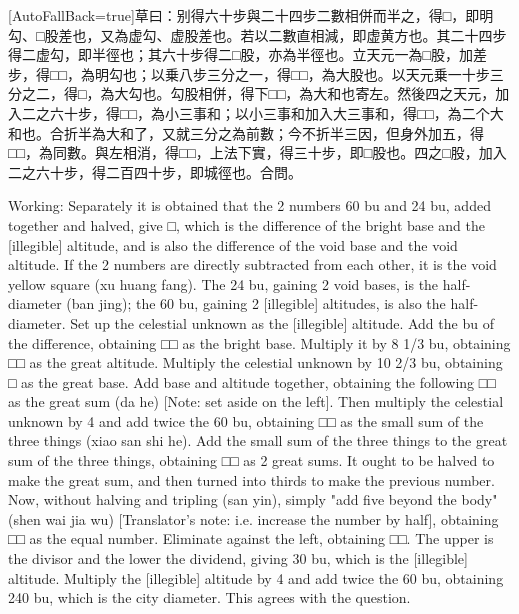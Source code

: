 \documentclass[11pt]{article}
\newcommand{\zhsmall}{\footnotesize\color{black!70}}
\newcommand{\unitlabel}[1]{\marginpar{\raggedleft\tiny\color{gray}#1}}
\newenvironment{unitzh}{\par\CJKfontspec{Noto Serif CJK SC}[AutoFallBack=true]\large\linespread{1.25}\selectfont}{\par}
\newenvironment{uniten}{\par\small\color{black!85}}{\par\medskip}
\begin{document}
\begin{unitzh}\unitlabel{ceyuan-033.18}草曰：别得六十步與二十四步二數相併而半之，得□，即明勾、□股差也，又為虚勾、虚股差也。若以二數直相減，即虚黄方也。其二十四步得二虚勾，即半徑也；其六十步得二□股，亦為半徑也。立天元一為□股，加差步，得□□，為明勾也；以乗八步三分之一，得□□，為大股也。以天元乗一十步三分之二，得□，為大勾也。勾股相併，得下□□，為大和也{\zhsmall 寄左}。然後四之天元，加入二之六十步，得□□，為小三事和；以小三事和加入大三事和，得□□，為二个大和也。合折半為大和了，又就三分之為前數；今不折半三因，但身外加五，得□□，為同數。與左相消，得□□，上法下實，得三十步，即□股也。四之□股，加入二之六十步，得二百四十步，即城徑也。合問。\end{unitzh}
\begin{uniten}Working: Separately it is obtained that the 2 numbers 60 bu and 24 bu, added together and halved, give □, which is the difference of the bright base and the [illegible] altitude, and is also the difference of the void base and the void altitude. If the 2 numbers are directly subtracted from each other, it is the void yellow square (xu huang fang). The 24 bu, gaining 2 void bases, is the half-diameter (ban jing); the 60 bu, gaining 2 [illegible] altitudes, is also the half-diameter. Set up the celestial unknown as the [illegible] altitude. Add the bu of the difference, obtaining □□ as the bright base. Multiply it by 8 1/3 bu, obtaining □□ as the great altitude. Multiply the celestial unknown by 10 2/3 bu, obtaining □ as the great base. Add base and altitude together, obtaining the following □□ as the great sum (da he) [Note: set aside on the left]. Then multiply the celestial unknown by 4 and add twice the 60 bu, obtaining □□ as the small sum of the three things (xiao san shi he). Add the small sum of the three things to the great sum of the three things, obtaining □□ as 2 great sums. It ought to be halved to make the great sum, and then turned into thirds to make the previous number. Now, without halving and tripling (san yin), simply "add five beyond the body" (shen wai jia wu) [Translator's note: i.e. increase the number by half], obtaining □□ as the equal number. Eliminate against the left, obtaining □□. The upper is the divisor and the lower the dividend, giving 30 bu, which is the [illegible] altitude. Multiply the [illegible] altitude by 4 and add twice the 60 bu, obtaining 240 bu, which is the city diameter. This agrees with the question.\end{uniten}
\end{document}
